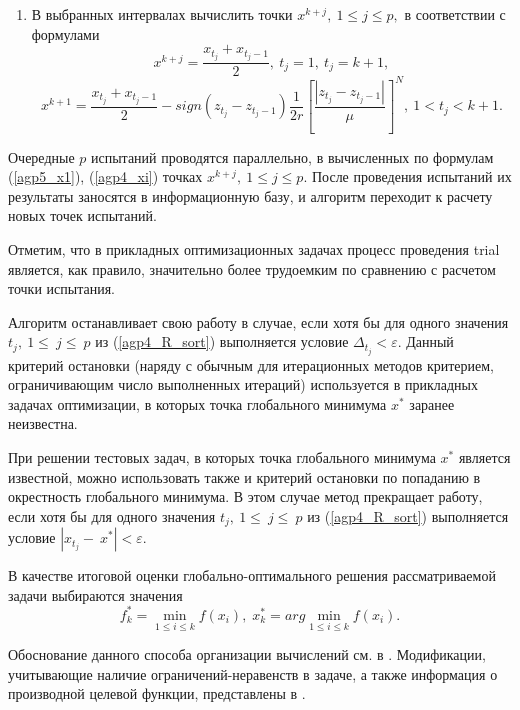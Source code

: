 \documentclass{svproc}
\begin{document}
\begin{enumerate}
\item В выбранных интервалах вычислить точки $x^{k+j},\ 1\leq j\leq p,$ в соответствии с формулами
\begin{equation}
\label{agp5_x1}
	x^{k+j}=\frac{x_{t_j}+x_{t_j-1}}{2},\ t_j=1,\ t_j=k+1,
\end{equation}	
	\begin{equation}
\label{agp4_xi}	
	x^{k+1}=\frac{x_{t_j}+x_{t_j-1}}{2}-sign\left(z_{t_j}-z_{t_j-1}\right)\frac{1}{2r}\left[\frac{\left|z_{t_j}-z_{t_j-1}\right|}{\mu}\right]^N,\ 1<t_j<k+1.
\end{equation}	

\end{enumerate}

Очередные $p$ испытаний проводятся параллельно, в вычисленных по формулам (\ref{agp5_x1}), (\ref{agp4_xi}) точках $x^{k+j},\ 1\leq j\leq p$. После проведения испытаний их результаты заносятся в информационную базу, и алгоритм переходит к расчету новых точек испытаний.

Отметим, что в прикладных оптимизационных задачах процесс проведения trial является, как правило, значительно более трудоемким по сравнению с расчетом точки испытания.

Алгоритм останавливает свою работу в случае, если хотя бы для одного значения $t_j,\ 1\le\ j\le\ p$ из (\ref{agp4_R_sort}) выполняется условие \(\Delta_{t_j} < \varepsilon\). Данный критерий остановки (наряду с обычным для итерационных методов критерием, ограничивающим число выполненных итераций) используется в прикладных задачах оптимизации, в которых точка глобального минимума $x^*$ заранее неизвестна. 
	 
При решении тестовых задач, в которых точка глобального минимума $x^*$ является  известной, можно использовать также и критерий остановки по попаданию в окрестность глобального минимума. В этом случае метод прекращает работу, если хотя бы для одного значения $t_j,\ 1\le\ j\le\ p$ из (\ref{agp4_R_sort}) выполняется условие $\left|x_{t_j}-\ x^\ast\right| < \varepsilon.$
	
В качестве итоговой оценки глобально-оптимального решения рассматриваемой задачи выбираются значения 
\begin{equation}
f_k^*=\min_{1\leq i \leq k}f(x_i), \; x_k^*=arg \min_{1\leq i \leq k}f(x_i).
\end{equation}



Обоснование данного способа организации вычислений см. в \cite{fio_bib20}. Модификации, учитывающие наличие ограничений-неравенств в задаче, а также информация о производной целевой функции, представлены в \cite{fio_bib12, fio_bib9, fio_bib11}.
\end{document}

